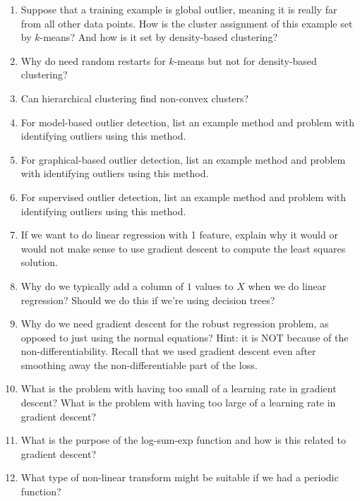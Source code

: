 \documentclass{article}
\begin{document}
\begin{enumerate}
\item Suppose that a training example is global outlier, meaning it is really far from all other data points. How is the cluster assignment of this example set by $k$-means? And how is it set by density-based clustering?
%
\item Why do need random restarts for $k$-means but not for density-based clustering?
%
\item Can hierarchical clustering find non-convex clusters?
%
\item For model-based outlier detection, list an example method and problem with identifying outliers using this method.
%
\item For graphical-based outlier detection, list an example method and problem with identifying outliers using this method.
%
\item For supervised outlier detection, list an example method and problem with identifying outliers using this method.
%
\item If we want to do linear regression with 1 feature, explain why it would or would not make sense to use gradient descent to compute the least squares solution.
%
\item Why do we typically add a column of $1$ values to $X$ when we do linear regression? Should we do this if we're using decision trees?
%
\item Why do we need gradient descent for the robust regression problem, as opposed to just using the normal equations? Hint: it is NOT because of the non-differentiability. Recall that we used gradient descent even after smoothing away the non-differentiable part of the loss.
%
\item What is the problem with having too small of a learning rate in gradient descent? What is the problem with having too large of a learning rate in gradient descent?
%
\item What is the purpose of the log-sum-exp function and how is this related to gradient descent?
%
\item What type of non-linear transform might be suitable if we had a periodic function?
%
\end{enumerate}
\end{document}
